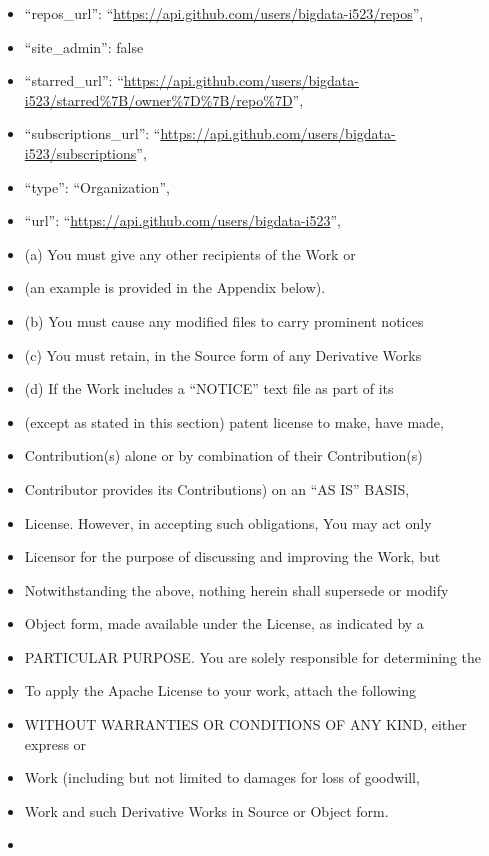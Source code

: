 \begin{itemize}
\item
  ``repos\_url'':
  ``\url{https://api.github.com/users/bigdata-i523/repos}'',
\item
  ``site\_admin'': false
\item
  ``starred\_url'':
  ``\url{https://api.github.com/users/bigdata-i523/starred\%7B/owner\%7D\%7B/repo\%7D}'',
\item
  ``subscriptions\_url'':
  ``\url{https://api.github.com/users/bigdata-i523/subscriptions}'',
\item
  ``type'': ``Organization'',
\item
  ``url'': ``\url{https://api.github.com/users/bigdata-i523}'',
\item
  (a) You must give any other recipients of the Work or
\item
  (an example is provided in the Appendix below).
\item
  (b) You must cause any modified files to carry prominent notices
\item
  (c) You must retain, in the Source form of any Derivative Works
\item
  (d) If the Work includes a ``NOTICE'' text file as part of its
\item
  (except as stated in this section) patent license to make, have made,
\item
  Contribution(s) alone or by combination of their Contribution(s)
\item
  Contributor provides its Contributions) on an ``AS IS'' BASIS,
\item
  License. However, in accepting such obligations, You may act only
\item
  Licensor for the purpose of discussing and improving the Work, but
\item
  Notwithstanding the above, nothing herein shall supersede or modify
\item
  Object form, made available under the License, as indicated by a
\item
  PARTICULAR PURPOSE. You are solely responsible for determining the
\item
  To apply the Apache License to your work, attach the following
\item
  WITHOUT WARRANTIES OR CONDITIONS OF ANY KIND, either express or
\item
  Work (including but not limited to damages for loss of goodwill,
\item
  Work and such Derivative Works in Source or Object form.
\item

\end{itemize}
